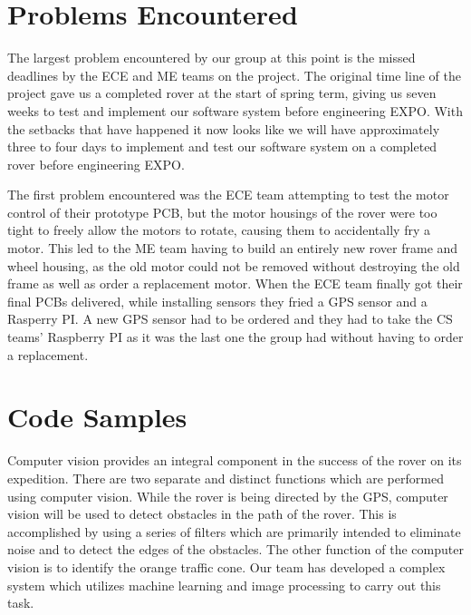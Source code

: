 \documentclass[10pt,letterpaper,onecolumn,draftclsnofoot,journal]{IEEEtran}
\begin{document}
\section{\textbf{Problems Encountered}}
The largest problem encountered by our group at this point is the missed deadlines by the ECE and ME teams on the project. The original time line of the project gave us a completed rover at the start of spring term, giving us seven weeks to test and implement our software system before engineering EXPO. With the setbacks that have happened it now looks like we will have approximately three to four days to implement and test our software system on a completed rover before engineering EXPO.\vspace{.3cm}
\par 
The first problem encountered was the ECE team attempting to test the motor control of their prototype PCB, but the motor housings of the rover were too tight to freely allow the motors to rotate, causing them to accidentally fry a motor. This led to the ME team having to build an entirely new rover frame and wheel housing, as the old motor could not be removed without destroying the old frame as well as order a replacement motor. When the ECE team finally got their final PCBs delivered, while installing sensors they fried a GPS sensor and a Rasperry PI. A new GPS sensor had to be ordered and they had to take the CS teams' Raspberry PI as it was the last one the group had without having to order a replacement.


\section{\textbf{Code Samples}}
Computer vision provides an integral component in the success of the rover on its expedition. There are two separate and distinct functions which are performed using computer vision. While the rover is being directed by the GPS, computer vision will be used to detect obstacles in the path of the rover. This is accomplished by using a series of filters which are primarily intended to eliminate noise and to detect the edges of the obstacles. The other function of the computer vision is to identify the orange traffic cone. Our team has developed a complex system which utilizes machine learning and image processing to carry out this task.\vspace{.3cm}
\par
\end{document}
